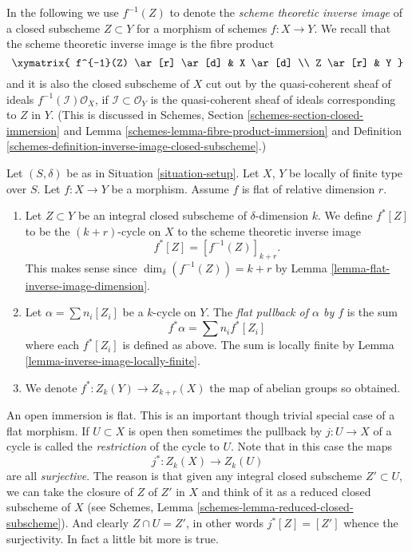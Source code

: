 \noindent
In the following we use $f^{-1}(Z)$ to denote the
{\it scheme theoretic inverse image} of a closed subscheme
$Z \subset Y$ for a morphism of schemes $f : X \to Y$.
We recall that the scheme theoretic inverse image is the fibre product
$$
\xymatrix{
f^{-1}(Z) \ar[r] \ar[d] & X \ar[d] \\
Z \ar[r] & Y
}
$$
and it is also the closed subscheme of $X$ cut out by the
quasi-coherent sheaf of ideals $f^{-1}(\mathcal{I})\mathcal{O}_X$, if
$\mathcal{I} \subset \mathcal{O}_Y$ is the quasi-coherent sheaf of ideals
corresponding to $Z$ in $Y$.
(This is discussed in
Schemes, Section \ref{schemes-section-closed-immersion} and
Lemma \ref{schemes-lemma-fibre-product-immersion}
and Definition \ref{schemes-definition-inverse-image-closed-subscheme}.)

\begin{definition}
\label{definition-flat-pullback}
Let $(S, \delta)$ be as in Situation \ref{situation-setup}.
Let $X$, $Y$ be locally of finite type over $S$.
Let $f : X \to Y$ be a morphism.
Assume $f$ is flat of relative dimension $r$.
\begin{enumerate}
\item Let $Z \subset Y$ be an integral closed subscheme of
$\delta$-dimension $k$. We define $f^*[Z]$ to be the
$(k+r)$-cycle on $X$ to the scheme theoretic inverse image
$$
f^*[Z] = [f^{-1}(Z)]_{k+r}.
$$
This makes sense since $\dim_\delta(f^{-1}(Z)) = k + r$
by Lemma \ref{lemma-flat-inverse-image-dimension}.
\item Let $\alpha = \sum n_i [Z_i]$ be
a $k$-cycle on $Y$. The {\it flat pullback of $\alpha$ by $f$}
is the sum
$$
f^* \alpha = \sum n_i f^*[Z_i]
$$
where each $f^*[Z_i]$ is defined as above.
The sum is locally finite by Lemma \ref{lemma-inverse-image-locally-finite}.
\item We denote $f^* : Z_k(Y) \to Z_{k + r}(X)$ the map of abelian
groups so obtained.
\end{enumerate}
\end{definition}

\noindent
An open immersion is flat. This is an important though trivial special
case of a flat morphism. If $U \subset X$ is open then sometimes the
pullback by $j : U \to X$ of a cycle is called the {\it restriction} of the
cycle to $U$. Note that in this case the maps
$$
j^* : Z_k(X) \longrightarrow Z_k(U)
$$
are all {\it surjective}. The reason is that given any integral closed
subscheme $Z' \subset U$, we can take the closure of $Z$ of $Z'$ in $X$
and think of it as a reduced closed subscheme of $X$ (see
Schemes, Lemma \ref{schemes-lemma-reduced-closed-subscheme}).
And clearly $Z \cap U = Z'$, in other words
$j^*[Z] = [Z']$ whence the surjectivity. In fact a little bit more
is true.

